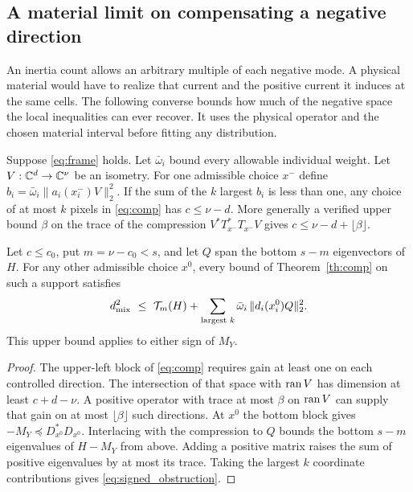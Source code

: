 \subsection{A material limit on compensating a negative direction}

An inertia count allows an arbitrary multiple of each negative mode. A physical material would have to realize that current and the positive current it induces at the same cells. The following converse bounds how much of the negative space the local inequalities can ever recover. It uses the physical operator and the chosen material interval before fitting any distribution.

\begin{proposition}\label{th:obstruction}
Suppose \eqref{eq:frame} holds. Let $\bar\omega_i$ bound every allowable individual weight. Let $V:\mathbb C^d\to\mathbb C^\nu$ be an isometry. For one admissible choice $x^-$ define $b_i=\bar\omega_i\|a_i(x^-_i)V\|_2^2$. If the sum of the $k$ largest $b_i$ is less than one, any choice of at most $k$ pixels in \eqref{eq:comp} has $c\le\nu-d$. More generally a verified upper bound $\beta$ on the trace of the compression $V^*T_{x^-}^*T_{x^-}V$ gives $c\le\nu-d+\lfloor\beta\rfloor$.

Let $c\le c_0$, put $m=\nu-c_0<s$, and let $Q$ span the bottom $s-m$ eigenvectors of $H$. For any other admissible choice $x^0$, every bound of Theorem~\ref{th:comp} on such a support satisfies
\begin{equation}
 d_{\rm mix}^2\ \le\ \mathcal T_m(H)+
 \sum_{\text{largest }k}\bar\omega_i\,\|d_i(x^0_i)Q\|_2^2 .
 \label{eq:signed_obstruction}
\end{equation}
This upper bound applies to either sign of $M_Y$.
\end{proposition}
\begin{proof}
The upper-left block of \eqref{eq:comp} requires gain at least one on each controlled direction. The intersection of that space with $\operatorname{ran} V$ has dimension at least $c+d-\nu$. A positive operator with trace at most $\beta$ on $\operatorname{ran} V$ can supply that gain on at most $\lfloor\beta\rfloor$ such directions. At $x^0$ the bottom block gives $-M_Y\preceq D_{x^0}^*D_{x^0}$. Interlacing with the compression to $Q$ bounds the bottom $s-m$ eigenvalues of $H-M_Y$ from above. Adding a positive matrix raises the sum of positive eigenvalues by at most its trace. Taking the largest $k$ coordinate contributions gives \eqref{eq:signed_obstruction}.
\end{proof}
